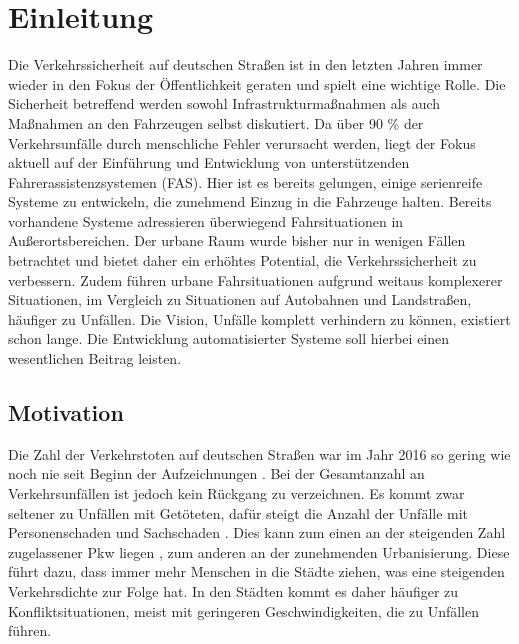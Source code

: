 
\chapter{Einleitung}\label{chapter:Motivation}
Die Verkehrssicherheit auf deutschen Straßen ist in den letzten Jahren immer wieder in den Fokus der Öffentlichkeit geraten und spielt eine wichtige Rolle. Die Sicherheit betreffend werden sowohl Infrastrukturmaßnahmen als auch Maßnahmen an den Fahrzeugen selbst diskutiert. Da über 90 \% \parencite[S. 48]{DEKRA.2017} der Verkehrsunfälle durch menschliche Fehler verursacht werden, liegt der Fokus aktuell auf der Einführung und Entwicklung von unterstützenden Fahrerassistenzsystemen (FAS). Hier ist es bereits gelungen, einige serienreife  Systeme zu entwickeln, die zunehmend Einzug in die Fahrzeuge halten. Bereits vorhandene Systeme adressieren überwiegend Fahrsituationen in Außerortsbereichen. Der urbane Raum wurde bisher nur in wenigen Fällen betrachtet und bietet daher ein erhöhtes Potential, die Verkehrssicherheit zu verbessern. Zudem führen urbane Fahrsituationen aufgrund weitaus komplexerer Situationen, im Vergleich zu Situationen auf Autobahnen und Landstraßen, häufiger zu Unfällen. Die Vision, Unfälle komplett verhindern zu können, existiert schon lange. Die Entwicklung automatisierter Systeme soll hierbei einen wesentlichen Beitrag leisten. 

\section{Motivation}
Die Zahl der Verkehrstoten auf deutschen Straßen war im Jahr 2016 so gering wie noch nie seit Beginn der Aufzeichnungen \parencite[S. 5]{StatistischesBundesamt.2018}. Bei der Gesamtanzahl an Verkehrsunfällen ist jedoch kein Rückgang zu verzeichnen. Es kommt zwar seltener zu Unfällen mit Getöteten, dafür steigt die Anzahl der Unfälle mit Personenschaden und Sachschaden \parencite[S. 5]{StatistischesBundesamt.2018}. Dies kann zum einen an der steigenden Zahl zugelassener Pkw liegen \parencite[S. 5]{StatistischesBundesamt.2018}, zum anderen an der zunehmenden Urbanisierung. Diese führt dazu, dass immer mehr Menschen in die Städte ziehen, was eine steigenden Verkehrsdichte zur Folge hat. In den Städten kommt es daher häufiger zu Konfliktsituationen, meist mit geringeren Geschwindigkeiten, die zu Unfällen führen.

